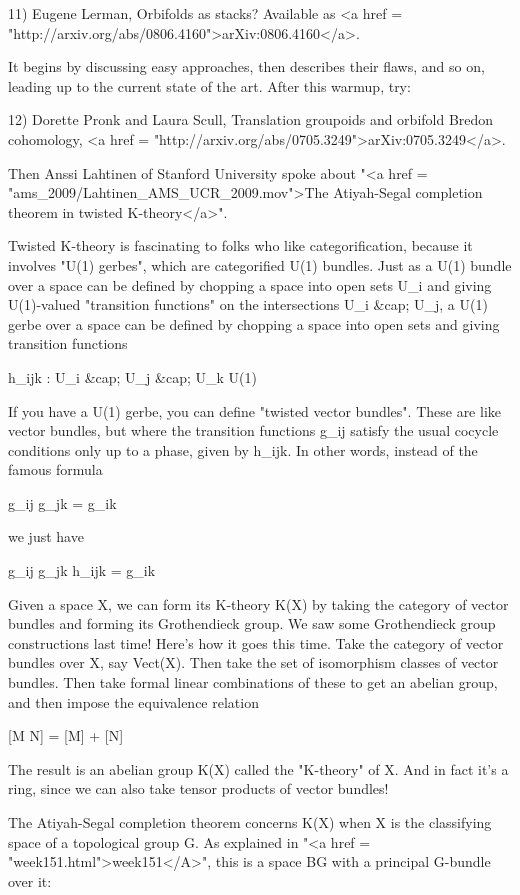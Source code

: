 11) Eugene Lerman, Orbifolds as stacks?  Available as <a href =
"http://arxiv.org/abs/0806.4160">arXiv:0806.4160</a>.

It begins by discussing easy approaches, then describes their flaws,
and so on, leading up to the current state of the art.  After this
warmup, try:

12) Dorette Pronk and Laura Scull, Translation groupoids and orbifold
Bredon cohomology, <a href =
"http://arxiv.org/abs/0705.3249">arXiv:0705.3249</a>.

Then Anssi Lahtinen of Stanford University spoke about "<a href =
"ams_2009/Lahtinen_AMS_UCR_2009.mov">The Atiyah-Segal completion
theorem in twisted K-theory</a>".

Twisted K-theory is fascinating to folks who like categorification,
because it involves "U(1) gerbes", which are categorified
U(1) bundles.  Just as a U(1) bundle over a space can be defined by
chopping a space into open sets U_{i} and giving U(1)-valued
"transition functions" on the intersections U_{i}
&cap; U_{j}, a U(1) gerbe over a space can be defined by
chopping a space into open sets and giving transition functions

h_{ijk} : U_{i} &cap; U_{j} &cap; U_{k}
\to  U(1)

If you have a U(1) gerbe, you can define "twisted vector bundles".
These are like vector bundles, but where the transition functions
g_{ij} satisfy the usual cocycle conditions only up to a phase, given
by h_{ijk}.  In other words, instead of the famous formula

g_{ij} g_{jk} = g_{ik}

we just have

g_{ij} g_{jk} h_{ijk} = g_{ik}

Given a space X, we can form its K-theory K(X) by taking the category
of vector bundles and forming its Grothendieck group.  We saw some
Grothendieck group constructions last time!  Here's how it goes this
time.  Take the category of vector bundles over X, say Vect(X).  Then
take the set of isomorphism classes of vector bundles.  Then take
formal linear combinations of these to get an abelian group, and then
impose the equivalence relation

[M \oplus  N] = [M] + [N]

The result is an abelian group K(X) called the "K-theory" of
X.  And in fact it's a ring, since we can also take tensor products of
vector bundles!

The Atiyah-Segal completion theorem concerns K(X) when X is the
classifying space of a topological group G.  As explained in "<a
href = "week151.html">week151</A>", this is a space BG with a
principal G-bundle over it:

